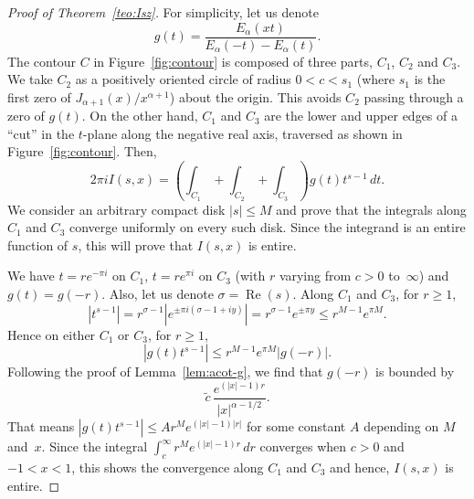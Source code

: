 \documentclass[a4paper]{amsart}
\newcommand{\Ea}{E_{\alpha}}
\renewcommand{\Re}{\operatorname{Re}}
\theoremstyle{plain}
\theoremstyle{definition}
\theoremstyle{remark}
\numberwithin{equation}{section}
\begin{document}
\begin{proof}[Proof of Theorem~\ref{teo:Isz}]
For simplicity, let us denote
\[
  g(t) = \frac{\Ea(xt)}{\Ea(-t)-\Ea(t)}.
\]
The contour $C$ in Figure~\ref{fig:contour} is composed of three parts, $C_1$, $C_2$ and $C_3$. We take $C_2$ as a positively oriented circle of radius $0< c < s_1$ (where $s_1$ is the first zero of $J_{\alpha+1}(x)/x^{\alpha+1}$) about the origin. This avoids $C_2$ passing through a zero of $g(t)$. On the other hand, $C_1$ and $C_3$ are the lower and upper edges of a ``cut'' in the $t$-plane along the negative real axis, traversed as shown in Figure~\ref{fig:contour}.
Then,
\begin{equation}
\label{eq:int-div}
   2\pi i I(s,x) = \left( \int_{C_1} + \int_{C_2}+ \int_{C_3}\right)g(t)t^{s-1}\,dt.
\end{equation}
We consider an arbitrary compact disk $|s|\leq M$ and prove that the integrals along $C_1$ and $C_3$ converge uniformly on every such disk. Since the integrand is an entire function of $s$, this will prove that $I(s,x)$ is entire. 

We have $t = re^{-\pi i}$ on $C_1$, $t=re^{\pi i}$ on $C_3$ (with $r$ varying from $c>0$ to~$\infty$) and $g(t) = g(-r)$. 
Also, let us denote $\sigma = \Re(s)$.
Along $C_1$ and $C_3$, for $r \geq 1$,
\[
|t^{s-1}| = r^{\sigma-1} |e^{\pm\pi i(\sigma-1+iy)}| 
= r^{\sigma-1}e^{\pm\pi y} \leq r^{M-1}e^{\pi M}.
\]
Hence on either $C_1$ or $C_3$, for $r\geq 1$,
\begin{equation*}
    \left|g(t) t^{s-1}\right| \leq r^{M-1}e^{\pi M}\left|g(-r)\right|.
\end{equation*}
Following the proof of Lemma~\ref{lem:acot-g}, we find that $g(-r)$ is bounded by 
\[
  \tilde{c} \, \frac{e^{(|x|-1)r}}{|x|^{\alpha-1/2}}.
\]
That means $|g(t) t^{s-1}| \leq A r^{M}e^{(|x|-1)|r|}$ for some constant $A$ depending on $M$ and~$x$. Since the integral $\int_c^{\infty} r^{M}e^{(|x|-1)r} \,dr$ converges when $c>0$ and $-1< x < 1$, this shows the convergence along $C_1$ and $C_3$ and hence, $I(s,x)$ is entire.


\end{proof}
\end{document}
